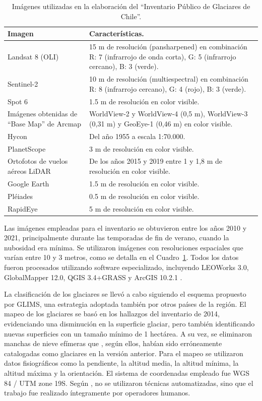 \begin{table}[H] 
\small
\caption{Imágenes utilizadas en la elaboración del ``Inventario Público de Glaciares de Chile''.\label{tab:ImagenesChile}}
\begin{tabularx}{\textwidth}{p{4.25cm}X}
\hline
\textbf{Imagen} & \textbf{Características}.\\ \hline 
Landsat 8 (OLI) & 15 m de resolución (pansharpened) en combinación R: 7
(infrarrojo de onda corta), G: 5 (infrarrojo cercano), B: 3 (verde).\\ \hline 
Sentinel-2 & 10 m de resolución (multiespectral) en combinación R: 8 (infrarrojo
cercano), G: 4 (rojo), B: 3 (verde).\\ \hline 
Spot 6 & 1.5 m de resolución en color visible.\\ \hline 
Imágenes obtenidas de ``Base Map'' de Arcmap & WorldView-2 y WorldView-4
(0,5 m), WorldView-3 (0,31 m) y GeoEye-1 (0,46 m) en color visible.\\ \hline 
Hycon & Del año 1955 a escala 1:70.000.\\ \hline 
PlanetScope & 3 m de resolución en color visible.\\ \hline 
Ortofotos de vuelos aéreos LiDAR & De los años 2015 y 2019 entre 1 y 1,8 m de
resolución en color visible.\\ \hline  
Google Earth & 1.5 m de resolución en color visible.\\ \hline 
Pléiades & 0.5 m de resolución en color visible.\\ \hline 
RapidEye & 5 m de resolución en color visible.\\ \hline 
\end{tabularx}
\end{table}

Las imágenes empleadas para el inventario se obtuvieron entre los años 2010 y 2021, principalmente durante las temporadas de fin de verano, cuando la nubosidad era mínima. Se utilizaron imágenes con resoluciones espaciales que varían entre 10 y 3 metros, como se detalla en el Cuadro~\ref{tab:ImagenesChile}. Todos los datos fueron procesados utilizando software especializado, incluyendo LEOWorks 3.0, GlobalMapper 12.0, QGIS 3.4+GRASS y ArcGIS 10.2.1  \cite{DGA2022}.

La clasificación de los glaciares se llevó a cabo siguiendo el esquema propuesto por GLIMS, una estrategia adoptada también por otros países de la región. El mapeo de los glaciares se basó en los hallazgos del inventario de 2014, evidenciando una disminución en la superficie glaciar, pero también identificando nuevas superficies con un tamaño mínimo de 1 hectárea. A su vez, se eliminaron manchas de nieve efímeras que , según ellos, habían sido erróneamente catalogadas como glaciares en la versión anterior. Para el mapeo se utilizaron datos fisiográficos como la pendiente, la altitud media, la altitud mínima, la altitud máxima y la orientación. El sistema de coordenadas empleado fue WGS 84 / UTM zone 19S. Según , no se utilizaron técnicas automatizadas, sino que el trabajo fue realizado íntegramente por operadores humanos.

